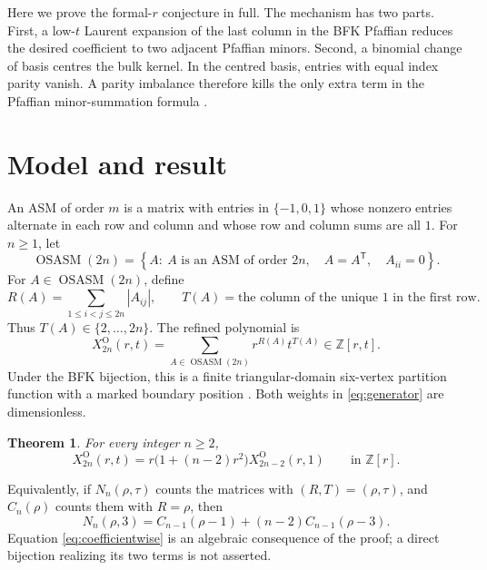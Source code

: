 \documentclass[11pt]{article}
\newtheorem{theorem}{Theorem}
\newcommand{\OSASM}{\operatorname{OSASM}}
\newcommand{\Z}{\mathbb{Z}}
\begin{document}
Here we prove the formal-\(r\) conjecture in full.  The mechanism has two
parts.  First, a low-\(t\) Laurent expansion of the last column in the BFK
Pfaffian reduces the desired coefficient to two adjacent Pfaffian minors.
Second, a binomial change of basis centres the bulk kernel.  In the centred
basis, entries with equal index parity vanish.  A parity imbalance therefore
kills the only extra term in the Pfaffian minor-summation formula
\cite{IshikawaWakayama1995}.

\section{Model and result}

An ASM of order \(m\) is a matrix with entries in
\(\{-1,0,1\}\) whose nonzero entries alternate in each row and column and
whose row and column sums are all \(1\).  For \(n\geq 1\), let
\[
 \OSASM(2n)=
 \left\{A:\ A\text{ is an ASM of order }2n,\quad
 A=A^{\mathsf T},\quad A_{ii}=0\right\}.
\]
For \(A\in\OSASM(2n)\), define
\[
 R(A)=\sum_{1\leq i<j\leq 2n}|A_{ij}|,\qquad
 T(A)=\text{the column of the unique \(1\) in the first row}.
\]
Thus \(T(A)\in\{2,\ldots,2n\}\).  The refined polynomial is
\begin{equation}
 X^{\mathrm O}_{2n}(r,t)
 =\sum_{A\in\OSASM(2n)}r^{R(A)}t^{T(A)}
 \in\Z[r,t].
 \label{eq:generator}
\end{equation}
Under the BFK bijection, this is a finite triangular-domain six-vertex
partition function with a marked boundary position \cite{BFK2026}.  Both
weights in \eqref{eq:generator} are dimensionless.

\begin{theorem}
\label{thm:main}
For every integer \(n\geq2\),
\begin{equation}
 [t^3]X^{\mathrm O}_{2n}(r,t)
 =r\bigl(1+(n-2)r^2\bigr)X^{\mathrm O}_{2n-2}(r,1)
 \qquad\text{in }\Z[r].
 \label{eq:main}
\end{equation}
\end{theorem}

Equivalently, if \(N_n(\rho,\tau)\) counts the matrices with
\((R,T)=(\rho,\tau)\), and \(C_n(\rho)\) counts them with \(R=\rho\), then
\begin{equation}
 N_n(\rho,3)
 =C_{n-1}(\rho-1)+(n-2)C_{n-1}(\rho-3).
 \label{eq:coefficientwise}
\end{equation}
Equation \eqref{eq:coefficientwise} is an algebraic consequence of the
proof; a direct bijection realizing its two terms is not asserted.
\end{document}
